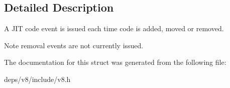 \subsection{Detailed Description}
A J\+I\+T code event is issued each time code is added, moved or removed.

\begin{DoxyNote}{Note}
removal events are not currently issued. 
\end{DoxyNote}


The documentation for this struct was generated from the following file\+:\begin{DoxyCompactItemize}
\item 
deps/v8/include/v8.\+h\end{DoxyCompactItemize}
